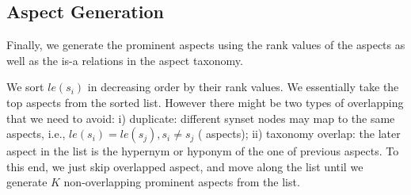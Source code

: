 \subsection{Aspect Generation}
\label{sec:generation}
Finally, we generate the prominent aspects 
using the rank values of the aspects as well as the is-a relations
in the aspect taxonomy.

We sort $le(s_i)$ in decreasing order by their rank values.
We essentially take the top aspects from the sorted list.
However there might be two types of overlapping that we need to
avoid:
i) duplicate: different synset nodes may map to the same aspects, 
i.e., $le(s_i) = le(s_j), s_i \neq s_j$ ( aspects);
ii) taxonomy overlap: the later aspect in the list is the 
hypernym or hyponym of the one of previous aspects.
To this end, we just skip overlapped aspect, and move along the list
until we generate $K$ non-overlapping prominent aspects from the list.


%

